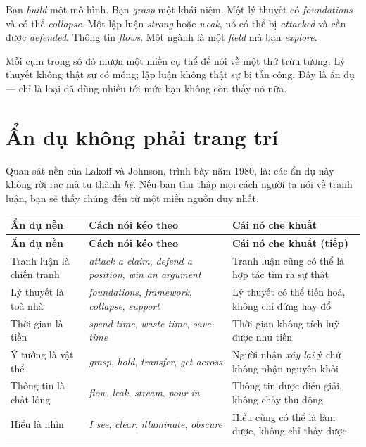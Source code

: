 \documentclass[../../english.tex]{subfiles}
\begin{document}
Bạn \emph{build} một mô hình. Bạn \emph{grasp} một khái niệm. Một lý thuyết có \emph{foundations} và có thể \emph{collapse}. Một lập luận \emph{strong} hoặc \emph{weak}, nó có thể bị \emph{attacked} và cần được \emph{defended}. Thông tin \emph{flows}. Một ngành là một \emph{field} mà bạn \emph{explore}.

Mỗi cụm trong số đó mượn một miền cụ thể để nói về một thứ trừu tượng. Lý thuyết không thật sự có móng; lập luận không thật sự bị tấn công. Đây là ẩn dụ --- chỉ là loại đã dùng nhiều tới mức bạn không còn thấy nó nữa.

\section{Ẩn dụ không phải trang trí}

Quan sát nền của Lakoff và Johnson, trình bày năm 1980\cite{lakoff1980}, là: các ẩn dụ này không rời rạc mà tụ thành \emph{hệ}. Nếu bạn thu thập mọi cách người ta nói về tranh luận, bạn sẽ thấy chúng đến từ một miền nguồn duy nhất.

\begin{center}\footnotesize
{}
\begin{longtable}{@{}L{4.4cm}L{4.6cm}L{5.4cm}@{}}
\toprule
\textbf{Ẩn dụ nền} & \textbf{Cách nói kéo theo} & \textbf{Cái nó che khuất}\\
\midrule
\endfirsthead
\toprule
\textbf{Ẩn dụ nền} & \textbf{Cách nói kéo theo} & \textbf{Cái nó che khuất (tiếp)}\\
\midrule
\endhead
Tranh luận là chiến tranh & \emph{attack a claim}, \emph{defend a position}, \emph{win an argument} & Tranh luận cũng có thể là hợp tác tìm ra sự thật\\
Lý thuyết là toà nhà & \emph{foundations}, \emph{framework}, \emph{collapse}, \emph{support} & Lý thuyết có thể tiến hoá, không chỉ đứng hay đổ\\
Thời gian là tiền & \emph{spend time}, \emph{waste time}, \emph{save time} & Thời gian không tích luỹ được như tiền\\
Ý tưởng là vật thể & \emph{grasp}, \emph{hold}, \emph{transfer}, \emph{get across} & Người nhận \emph{xây lại} ý chứ không nhận nguyên khối\\
Thông tin là chất lỏng & \emph{flow}, \emph{leak}, \emph{stream}, \emph{pour in} & Thông tin được diễn giải, không chảy thụ động\\
Hiểu là nhìn & \emph{I see}, \emph{clear}, \emph{illuminate}, \emph{obscure} & Hiểu cũng có thể là làm được, không chỉ thấy được\\
\bottomrule
\end{longtable}
\end{center}
\end{document}
